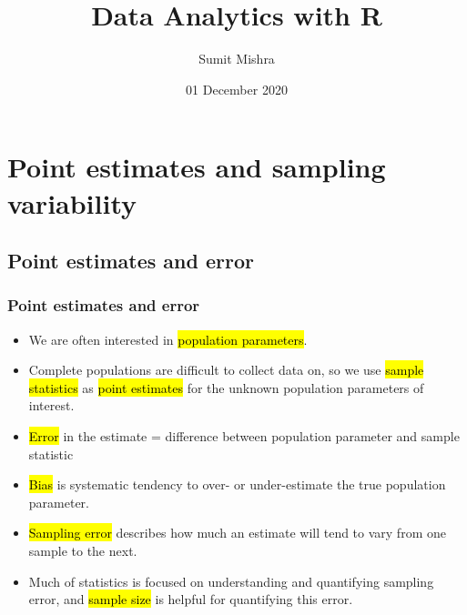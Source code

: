 \documentclass[notes,11pt, aspectratio=169]{beamer}
\title[DAR]{Data Analytics with R}  %
\author{Sumit Mishra} %
\institute[IFMR] %
{
  Institute for Financial Management and Research, Sri City \\ %
  \medskip
  \medskip
  \textbf{Foundations of Inference}
}
\date{01 December 2020} %
\begin{document}
  
  {
    \addtocounter{framenumber}{-1} 
    {\removepagenumbers 
      \begin{frame}
      
      
      \titlepage
      
      \end{frame}
    }
  }


\section{Point estimates and sampling variability}


\subsection{Point estimates and error}


\begin{frame}
\frametitle{Point estimates and error}

\begin{itemize}

\item We are often interested in \hl{population parameters}.

\item Complete populations are difficult to collect data on, so we use \hl{sample statistics} as \hl{point estimates} for the unknown population parameters of interest.

\item \hl{Error} in the estimate = difference between population parameter and sample statistic

\item \hl{Bias} is systematic tendency to over- or under-estimate the true population parameter.

\item \hl{Sampling error} describes how much an estimate will tend to vary from one sample to the next.

\item Much of statistics is focused on understanding and quantifying sampling error, and \hl{sample size} is helpful for quantifying this error.

\end{itemize}

\end{frame}
\end{document}
